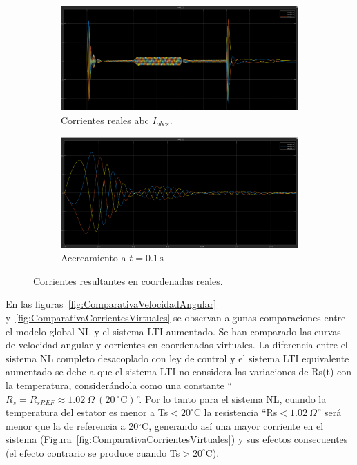 \documentclass{article}
\begin{document}
\begin{figure}[H]
    \centering
    \begin{subfigure}[b]{0.5\textwidth}
        \centering
        \includegraphics[width=\textwidth]{Imagenes/CorrientesABCSimulacion.png}
        \caption{Corrientes reales abc \(I_{abcs}\).}
        \label{fig:CorrientesRealesGlobalDT}
    \end{subfigure}
    \hfill
    \begin{subfigure}[b]{0.48\textwidth}
        \centering
        \includegraphics[width=\textwidth]{Imagenes/CorrientesABCacercamientoSimulacion.png}
        \caption{Acercamiento a $t = 0{.}1\,\text{s}$}
        \label{fig:CorrientesRealesAcercamientoGlobalDT}
    \end{subfigure}
    \caption{Corrientes resultantes en coordenadas reales.}
    \label{fig:SimulaciónCorrientesCoordenadasReales}
\end{figure}

En las figuras~\ref{fig:ComparativaVelocidadAngular} y~\ref{fig:ComparativaCorrientesVirtuales} se observan algunas comparaciones entre el modelo global NL y el sistema LTI aumentado. Se han comparado las curvas de velocidad angular y corrientes en coordenadas virtuales. La diferencia entre el sistema NL completo desacoplado con ley de control y el sistema LTI equivalente aumentado se debe a que el sistema LTI no considera las variaciones de Rs(t) con la temperatura, considerándola como una constante ``$R_s = R_{sREF} \approx 1.02\:\Omega\:(20\:^{\circ}\text{C})$''. Por lo tanto para el sistema NL, cuando la temperatura del estator es menor a Ts$<20^{\circ}$C la resistencia ``Rs$<1.02\:\Omega$'' será menor que la de referencia a 20$^{\circ}$C, generando así una mayor corriente en el sistema (Figura~\ref{fig:ComparativaCorrientesVirtuales}) y sus efectos consecuentes (el efecto contrario se produce cuando Ts$>20^{\circ}$C).
\end{document}
